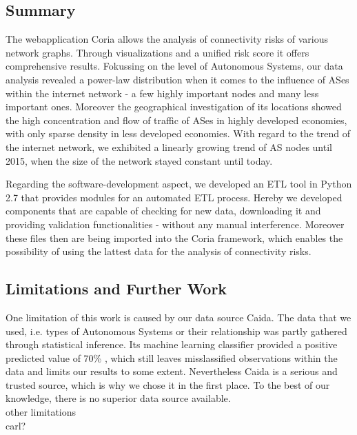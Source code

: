 \documentclass[conference, 11pt]{IEEEtran}
\begin{document}
\subsection{Summary}

The webapplication Coria allows the analysis of connectivity risks of various network graphs. Through visualizations and a unified risk score it offers comprehensive results. Fokussing on the level of Autonomous Systems, our data analysis revealed a power-law distribution when it comes to the influence of ASes within the internet network - a few highly important nodes and many less important ones. Moreover the geographical investigation of its locations showed the high concentration and flow of traffic of ASes in highly developed economies, with only sparse density in less developed economies. With regard to the trend of the internet network, we exhibited a linearly growing trend of AS nodes until 2015, when the size of the network stayed constant until today.

Regarding the software-development aspect, we developed an ETL tool in Python 2.7 that provides modules for an automated ETL process. Hereby we developed components that are capable of checking for new data, downloading it and providing validation functionalities - without any manual interference. Moreover these files then are being imported into the Coria framework, which enables the possibility of using the lattest data for the analysis of connectivity risks. \\
 

\subsection{Limitations and Further Work}
One limitation of this work is caused by our data source Caida. The data that we used, i.e. types of Autonomous Systems or their relationship was partly gathered through statistical inference. Its machine learning classifier provided a positive predicted value of 70\% \cite{Classification}, which still leaves misslassified observations within the data and limits our results to some extent. Nevertheless Caida is a serious and trusted source, which is why we chose it in the first place. To the best of our knowledge, there is no superior data source available.  \\ 

other limitations\\ 
carl? \\
\end{document}
